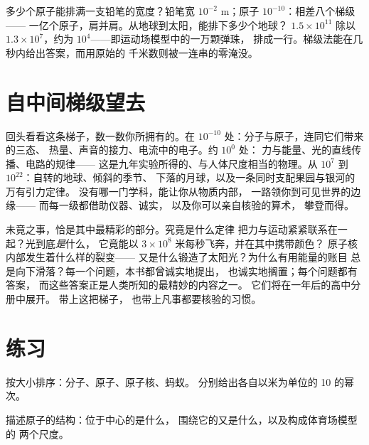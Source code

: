 \begin{example}[梯级运算]\label{ex:g9:atoms-to-galaxies:arithmetic}
多少个原子能排满一支铅笔的宽度？铅笔宽 $10^{-2}$
\unit{m}；原子 $10^{-10}$：相差八个梯级——
一亿个原子，肩并肩。从地球到太阳，能排下多少个地球？
$1.5 \times 10^{11}$ 除以 $1.3 \times 10^{7}$，约为
$10^{4}$——即运动场模型中的一万颗弹珠，
排成一行。梯级法能在几秒内给出答案，而用原始的
千米数则被一连串的零淹没。
\end{example}

\section{自中间梯级望去}

\begin{remark}[九年所建]\label{rem:g9:atoms-to-galaxies:built}
回头看看这条梯子，数一数你所拥有的。在
$10^{-10}$ 处：分子与原子，连同它们带来的三态、
热量、声音的接力、电流中的电子。约 $10^{0}$ 处：
力与能量、光的直线传播、电路的规律——
这是九年实验所得的、与人体尺度相当的物理。从
$10^{7}$ 到 $10^{22}$：自转的地球、倾斜的季节、
下落的月球，以及一条同时支配果园与银河的万有引力定律。
没有哪一门学科，能让你从物质内部，
一路领你到可见世界的边缘——
而每一级都借助仪器、诚实，
以及你可以亲自核验的算术，
攀登而得。
\end{remark}

\begin{remark}[前路所待]\label{rem:g9:atoms-to-galaxies:ahead}
未竟之事，恰是其中最精彩的部分。究竟是什么定律
把力与运动紧紧联系在一起？光到底\emph{是}什么，
它竟能以 $3 \times 10^{8}$ 米每秒飞奔，并在其中携带颜色？
原子核内部发生着什么样的裂变——
又是什么锻造了太阳光？为什么有用能量的账目
总是向下滑落？每一个问题，本书都曾诚实地提出，
也诚实地搁置；每个问题都有答案，
而这些答案正是人类所知的最精妙的内容之一。
它们将在一年后的高中分册中展开。
带上这把梯子，
也带上凡事都要核验的习惯。
\end{remark}

\section{练习}

\begin{exercise}[$\star$]\label{exo:g9:atoms-to-galaxies:1}
按大小排序：分子、原子、原子核、蚂蚁。
分别给出各自以米为单位的 10 的幂次。
\end{exercise}

\begin{exercise}[$\star$]\label{exo:g9:atoms-to-galaxies:2}
描述原子的结构：位于中心的是什么，
围绕它的又是什么，以及构成体育场模型的
两个尺度。
\end{exercise}

